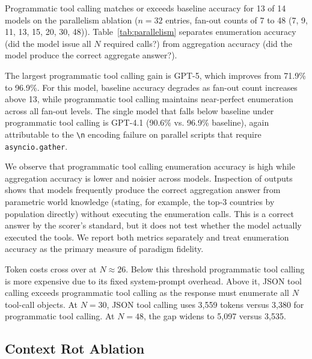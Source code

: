 \documentclass[11pt]{article}
\newcommand{\codemode}{programmatic tool calling}
\newcommand{\Codemode}{Programmatic tool calling}
\newcommand{\jsonmode}{JSON tool calling}
\newcommand{\nmodels}{14}
\begin{document}
\Codemode{} matches or exceeds baseline accuracy for 13 of \nmodels{} models
on the parallelism ablation ($n = 32$ entries, fan-out counts of 7 to 48 (7, 9, 11, 13, 15, 20, 30, 48)).
Table~\ref{tab:parallelism} separates enumeration accuracy (did the model issue
all $N$ required calls?) from aggregation accuracy (did the model produce the
correct aggregate answer?).

The largest \codemode{} gain is GPT-5, which improves from 71.9\% to 96.9\%.
For this model, baseline accuracy degrades as fan-out count increases above 13,
while \codemode{} maintains near-perfect enumeration across all fan-out levels.
The single model that falls below baseline under \codemode{} is GPT-4.1 (90.6\% vs.
96.9\% baseline), again attributable to the \texttt{\textbackslash n} encoding
failure on parallel scripts that require \texttt{asyncio.gather}.

We observe that \codemode{} enumeration accuracy is high while aggregation accuracy
is lower and noisier across models.
Inspection of outputs shows that models frequently produce the correct aggregation
answer from parametric world knowledge (stating, for example, the top-3
countries by population directly) without executing the enumeration calls.
This is a correct answer by the scorer's standard, but it does not test whether
the model actually executed the tools.
We report both metrics separately and treat enumeration accuracy as the
primary measure of paradigm fidelity.

Token costs cross over at $N \approx 26$. Below this threshold \codemode{}
is more expensive due to its fixed system-prompt overhead. Above it,
\jsonmode{} exceeds \codemode{} as the response must enumerate all $N$
tool-call objects. At $N = 30$, \jsonmode{} uses 3{,}559 tokens versus
3{,}380 for \codemode{}. At $N = 48$, the gap widens to 5{,}097 versus
3{,}535.

\subsection{Context Rot Ablation}
\end{document}
